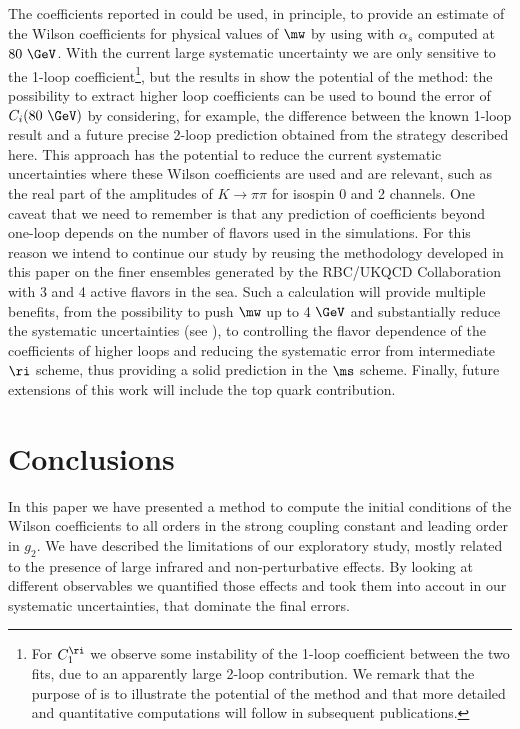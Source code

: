 \documentclass[aps,prd,twocolumn,nofootinbib,showpacs,superscriptaddress]{revtex4-1}
\begin{document}
The coefficients reported in  could be used, in principle, 
to provide an estimate of the Wilson coefficients for physical values
of $\mw$ by using  with $\alpha_s$ computed 
at $80~\GeV$. 
With the current large systematic uncertainty we are only sensitive to the 1-loop 
coefficient\footnote{
For $C_1^\ri$ we observe some instability of the 1-loop coefficient
between the two fits, due to an apparently large 2-loop contribution.
We remark that the purpose of  is to illustrate the potential 
of the method and that more detailed and quantitative computations will follow 
in subsequent publications.
}, but the results in  show the potential of the method:
the possibility to extract higher loop coefficients can
 be used to bound the error of $C_i(80~\GeV)$ by considering, for example, the
 difference between the known 1-loop result and 
a future precise 2-loop prediction obtained from the strategy described here.
This approach has the potential to reduce the current systematic uncertainties
where these Wilson coefficients are used and are relevant, 
such as the real part of the amplitudes 
of $K \to \pi \pi$ for isospin 0 and 2 channels.
One caveat that we need to remember is that any prediction of coefficients
beyond one-loop depends on the number of flavors used in the simulations.
For this reason we intend to continue our study by reusing the methodology
developed in this paper 
on the finer ensembles generated by the RBC/UKQCD 
Collaboration \cite{Frison:2014esa} with 3 and 4 active flavors in the sea.
Such a calculation will provide multiple benefits, from the possibility to
push $\mw$ up to 4 $\GeV$ and substantially reduce the systematic uncertainties
 (see ), to controlling the flavor dependence of the coefficients of 
 higher loops and reducing the systematic error from intermediate $\ri$ 
 scheme, thus providing a solid prediction in the $\ms$ scheme.
Finally, future extensions of this work will include the top quark contribution.

\section{Conclusions}

In this paper we have presented a method to compute the initial conditions of the
Wilson coefficients to all orders in the strong coupling constant and leading order
in $g_2$. We have described the limitations of our exploratory study, mostly 
related to the presence of large infrared and non-perturbative effects.
By looking at different observables we quantified those effects and took them into
accout in our systematic uncertainties, that dominate the final errors.
\end{document}
